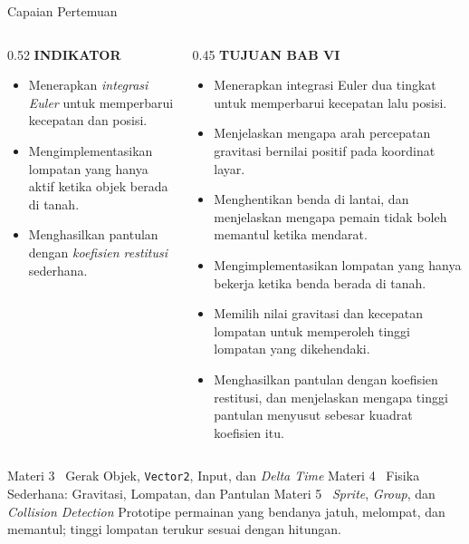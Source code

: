 \documentclass[aspectratio=169,10pt]{beamer}
\begin{document}
\begin{frame}{Capaian Pertemuan}
\begin{columns}[T,onlytextwidth]
\begin{column}{0.52\textwidth}
    {\fontsize{7}{8.5}\selectfont\bfseries\color{ubAccent}INDIKATOR}\par
    \vspace{0.06cm}
    \begin{itemize}
      \item Menerapkan \emph{integrasi Euler} untuk memperbarui kecepatan dan
            posisi.
      \item Mengimplementasikan lompatan yang hanya aktif ketika objek berada
            di tanah.
      \item Menghasilkan pantulan dengan \emph{koefisien restitusi} sederhana.
    \end{itemize}
  \end{column}
  \begin{column}{0.45\textwidth}
    {\fontsize{7}{8.5}\selectfont\bfseries\color{ubAccent}TUJUAN BAB VI}\par
    \vspace{0.08cm}
    \begin{itemize}
      \item Menerapkan integrasi Euler dua tingkat untuk memperbarui kecepatan
            lalu posisi.
      \item Menjelaskan mengapa arah percepatan gravitasi bernilai positif
            pada koordinat layar.
      \item Menghentikan benda di lantai, dan menjelaskan mengapa pemain tidak
            boleh memantul ketika mendarat.
      \item Mengimplementasikan lompatan yang hanya bekerja ketika benda berada
            di tanah.
      \item Memilih nilai gravitasi dan kecepatan lompatan untuk memperoleh
            tinggi lompatan yang dikehendaki.
      \item Menghasilkan pantulan dengan koefisien restitusi, dan menjelaskan
            mengapa tinggi pantulan menyusut sebesar kuadrat koefisien itu.
    \end{itemize}
  \end{column}
\end{columns}
\end{frame}

  {Materi 3 \textperiodcentered\ Gerak Objek, \texttt{Vector2}, Input, dan
   \emph{Delta Time}}
  {Materi 4 \textperiodcentered\ Fisika Sederhana: Gravitasi, Lompatan, dan
   Pantulan}
  {Materi 5 \textperiodcentered\ \emph{Sprite}, \emph{Group}, dan
   \emph{Collision Detection}}
  {Prototipe permainan yang bendanya jatuh, melompat, dan memantul; tinggi
   lompatan terukur sesuai dengan hitungan.}
\end{document}
